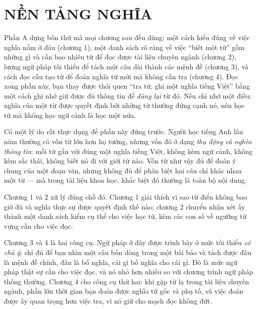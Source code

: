 \documentclass[../english.tex]{subfiles}
\begin{document}
\part{NỀN TẢNG NGHĨA}
\begin{tomtat}
Phần A dựng bốn thứ mà mọi chương sau đều dùng: một cách hiểu đúng về việc nghĩa nằm ở đâu (chương 1), một danh sách rõ ràng về việc ``biết một từ'' gồm những gì và cần bao nhiêu từ để đọc được tài liệu chuyên ngành (chương 2), lượng ngữ pháp tối thiểu để tách một câu dài thành các mệnh đề (chương 3), và cách đọc cấu tạo từ để đoán nghĩa từ mới mà không cần tra (chương 4). Đọc xong phần này, bạn thay được thói quen ``tra từ, ghi một nghĩa tiếng Việt'' bằng một cách ghi nhớ giữ được đủ thông tin để \emph{dùng lại} từ đó. Nếu chỉ nhớ một điều: nghĩa của một từ được quyết định bởi những từ thường đứng cạnh nó, nên học từ mà không học ngữ cảnh là học một nửa.
\end{tomtat}

Có một lý do rất thực dụng để phần này đứng trước. Người học tiếng Anh lâu năm thường có vốn từ lớn hơn họ tưởng, nhưng vốn đó ở dạng \emph{thụ động và nghèo thông tin}: mỗi từ gắn với đúng một nghĩa tiếng Việt, không kèm ngữ cảnh, không kèm sắc thái, không biết nó đi với giới từ nào. Vốn từ như vậy đủ để đoán ý chung của một đoạn văn, nhưng không đủ để phân biệt hai câu chỉ khác nhau một từ --- mà trong tài liệu khoa học, khác biệt đó thường là toàn bộ nội dung.

Chương 1 và 2 xử lý đúng chỗ đó. Chương 1 giải thích vì sao từ điển không bao giờ đủ và nghĩa thực sự được quyết định thế nào; chương 2 chuyển nhận xét ấy thành một danh sách kiểm cụ thể cho việc học từ, kèm các con số về ngưỡng từ vựng cần cho việc đọc.

Chương 3 và 4 là hai công cụ. Ngữ pháp ở đây được trình bày ở mức tối thiểu \emph{có chủ ý}: chỉ đủ để bạn nhìn một câu bốn dòng trong một bài báo và tách được đâu là mệnh đề chính, đâu là bổ nghĩa, cái gì bổ nghĩa cho cái gì. Đó là mức ngữ pháp thật sự cần cho việc đọc, và nó nhỏ hơn nhiều so với chương trình ngữ pháp thông thường. Chương 4 cho công cụ thứ hai: khi gặp từ lạ trong tài liệu chuyên ngành, phần lớn thời gian bạn đoán được nghĩa từ gốc và phụ tố, và việc đoán được ấy quan trọng hơn việc tra, vì nó giữ cho mạch đọc không đứt.





\ifSubfilesClassLoaded{\printbibliography[title={Nguồn}]}{}
\end{document}
